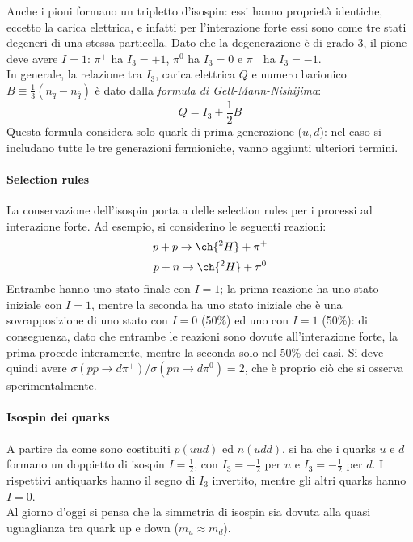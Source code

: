 Anche i pioni formano un tripletto d'isospin: essi hanno proprietà identiche, eccetto la carica elettrica, e infatti per l'interazione forte essi sono come tre stati degeneri di una stessa particella. Dato che la degenerazione è di grado 3, il pione deve avere $ I = 1 $: $ \pi^+ $ ha $ I_3 = +1 $, $ \pi^0 $ ha $ I_3 = 0 $ e $ \pi^- $ ha $ I_3 = -1 $.\\
In generale, la relazione tra $ I_3 $, carica elettrica $ Q $ e numero barionico $ B \equiv \frac{1}{3} \left( n_q - n_{\bar{q}} \right) $ è dato dalla \textit{formula di Gell-Mann-Nishijima}:
\begin{equation}
	Q = I_3 + \frac{1}{2} B
	\label{eq:9.2}
\end{equation}
Questa formula considera solo quark di prima generazione ($ u,d $): nel caso si includano tutte le tre generazioni fermioniche, vanno aggiunti ulteriori termini.

\paragraph{Selection rules}

La conservazione dell'isospin porta a delle selection rules per i processi ad interazione forte. Ad esempio, si considerino le seguenti reazioni:
\begin{equation*}
	p + p \rightarrow \ch{^2H} + \pi^+
\end{equation*}
\begin{equation*}
	p + n \rightarrow \ch{^2H} + \pi^0
\end{equation*}
Entrambe hanno uno stato finale con $ I = 1 $; la prima reazione ha uno stato iniziale con $ I = 1 $, mentre la seconda ha uno stato iniziale che è una sovrapposizione di uno stato con $ I = 0 $ (50\%) ed uno con $ I = 1 $ (50\%): di conseguenza, dato che entrambe le reazioni sono dovute all'interazione forte, la prima procede interamente, mentre la seconda solo nel 50\% dei casi. Si deve quindi avere $ \sigma(pp \rightarrow d\pi^+) / \sigma(pn \rightarrow d\pi^0) = 2 $, che è proprio ciò che si osserva sperimentalmente.

\paragraph{Isospin dei quarks}

A partire da come sono costituiti $ p \left( uud \right) $ ed $ n \left( udd \right) $, si ha che i quarks $ u $ e $ d $ formano un doppietto di isospin $ I = \frac{1}{2} $, con $ I_3 = +\frac{1}{2} $ per $ u $ e $ I_3 = -\frac{1}{2} $ per $ d $. I rispettivi antiquarks hanno il segno di $ I_3 $ invertito, mentre gli altri quarks hanno $ I = 0 $.\\
Al giorno d'oggi si pensa che la simmetria di isospin sia dovuta alla quasi uguaglianza tra quark up e down ($ m_u \approx m_d $).


